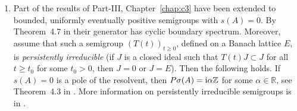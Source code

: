 \begin{enumerate}
\item
Part of the results of Part-III, Chapter~\ref{chap:c3} have been extended  to bounded,  uniformly eventually positive semigroups with $s(A)=0$. 
By Theorem~4.7 in \textcite{zbmath08029955} their generator has cyclic boundary spectrum. 
Moreover, assume that such a semigroup $(T(t))_{t\geq 0}$, defined on a  Banach lattice $E$, is \emph{persistently irreducible} (\ie if $J$ is a closed ideal such that $T(t)J \subset J$ for all $t\geq t_0$ for some  $t_0 > 0$, then $J = {0}$ or $J = E$).  
Then the following holds. 
If $s(A) = 0$ is a pole of the resolvent, then $P\sigma(A) = \mathrm{i} \alpha \mathbb{Z}$ for some $\alpha \in \mathbb{R}$, see Theorem~4.3 in \textcite{zbmath08029955}.
More information on persistently irreducible semigroups is in \textcite{zbmath07889246}.

\end{enumerate}

